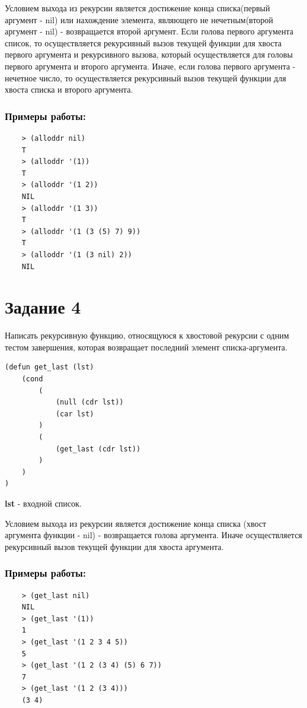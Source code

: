 \documentclass[a4paper, 12pt]{article}
\begin{document}
Условием выхода из рекурсии является достижение конца списка(первый аргумент - nil) или нахождение элемента, являющего не нечетным(второй аргумент - nil) - возвращается второй аргумент. Если голова первого аргумента список, то осуществляется рекурсивный вызов текущей функции для хвоста первого аргумента и рекурсивного вызова, который осуществляется для головы первого аргумента и второго аргумента. Иначе, если голова первого аргумента - нечетное число, то осуществляется рекурсивный вызов текущей функции для хвоста списка и второго аргумента.

\subsubsection*{Примеры работы:}
\begin{lstlisting}
	> (alloddr nil)
	T
	> (alloddr '(1))
	T
	> (alloddr '(1 2))
	NIL
	> (alloddr '(1 3))
	T
	> (alloddr '(1 (3 (5) 7) 9))
	T
	> (alloddr '(1 (3 nil) 2))
	NIL
\end{lstlisting}


\section*{Задание 4}
Написать рекурсивную функцию, относящуюся к хвостовой рекурсии с одним тестом завершения, которая возвращает последний элемент списка-аргумента.
\begin{lstlisting}[caption=Функция получения последнего элемента списка]
(defun get_last (lst)
	(cond 
		(
			(null (cdr lst))
			(car lst)
		)
		(
			(get_last (cdr lst))
		)
	)
)
\end{lstlisting}
\textbf{lst} - входной список.

Условием выхода из рекурсии является достижение конца списка (хвост аргумента функции - nil) - возвращается голова аргумента. Иначе осуществляется рекурсивный вызов текущей функции для хвоста аргумента.

\subsubsection*{Примеры работы:}
\begin{lstlisting}
	> (get_last nil)
	NIL
	> (get_last '(1))
	1
	> (get_last '(1 2 3 4 5))
	5
	> (get_last '(1 2 (3 4) (5) 6 7))
	7
	> (get_last '(1 2 (3 4)))
	(3 4)
\end{lstlisting}
\end{document}
